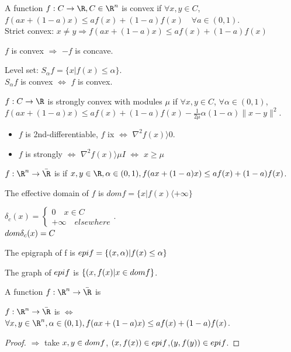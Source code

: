 \begin{definition}
A function $f : C \rightarrow \R, C \in \R^n$ is convex if $\forall x, y \in C$, $f(ax + (1-a)x) \le af(x) + (1-a)f(x) \quad \forall a \in (0,1)$.\\ 
Strict convex: $x \neq y \Rightarrow f(ax + (1-a)x) \le af(x) + (1-a)f(x) $
\end{definition}
\begin{remark}
$f$ is convex $\Rightarrow$ $-f$ is concave.
\end{remark}
Level set: $S_{\alpha}f = \{ x | f(x) \le \alpha \}$.\\ 
$S_{\alpha}f$ is convex $\Leftrightarrow$ $f$ is convex. \\
\begin{definition}
$f : C \rightarrow \R$ is strongly convex with modules $\mu$ if $\forall x, y \in C$, $\forall \alpha \in (0,1)$, $f(ax + (1-a)x) \le af(x) + (1-a)f(x) - \frac{1}{2\mu}\alpha(1- \alpha) \|x-y\|^2$.
\end{definition}

\begin{remark}
\begin{itemize}
\item $f$ is 2nd-differentiable, $f$ ix \cvx $\iff$ $\nabla^2f(x) \rangle  0$.
\item $f$ is strongly \cvx $\iff$ $\nabla^2f(x) \rangle  \mu I$ $\iff$ $x \ge \mu$
\end{itemize}
\end{remark}
\begin{definition}[2]
$f : \R^n \to \bar{\R} $ is \cvx  if $x, y  \in \R , \alpha \in (0,1), f(ax + (1-a)x) \le af(x) + (1-a)f(x)$.  
\end{definition}
The effective domain of $f$ is $dom f = \{x | f(x) \langle + \infty \}$ 
\begin{example}
$\delta_c(x) = \begin{cases}
0 \quad  x \in C \\
+ \infty \quad elsewhere
\end{cases}$.\\
$dom \space \delta_c(x) = C$
\end{example}
\begin{definition}[Epigraph]
The epigraph of f is $epi \space f = \{(x,\alpha) | f(x) \le \alpha\}$
\end{definition}
The graph of $epi \space f$ is $\{ (x,f(x) | x \in dom \space f\}$.
\begin{definition}[III]
A function $f : \R^n \to \bar{\R}$ is %
\end{definition}
\begin{theorem}
$f : \R^n \to \bar{\R}$ is \cvx  $\iff$ $\forall x,y \in \R^n, \alpha \in (0,1), f(ax + (1-a)x) \le af(x) + (1-a)f(x)$.
\end{theorem}
\begin{proof}
$\Rightarrow$ take $x,y \in dom \space f$, $(x,f(x)) \in epi \space f$,$(y,f(y)) \in epi \space f$.
\end{proof}

